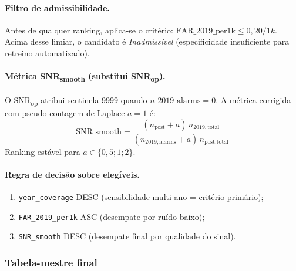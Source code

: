 \documentclass[11pt,a4paper]{article}
\begin{document}
\paragraph{Filtro de admissibilidade.}
Antes de qualquer ranking, aplica-se o crit\'erio:
$\mathrm{FAR\_2019\_per1k} \leq 0{,}20/1k$. Acima desse limiar, o
candidato \'e \emph{Inadmiss\'ivel} (espe\-ci\-fi\-ci\-da\-de
insuficiente para retreino automa\-ti\-zado).

\paragraph{M\'etrica SNR\textsubscript{smooth} (substitui SNR\textsubscript{op}).}
O SNR\textsubscript{op} atribui sentinela 9999 quando
$n\_2019\_\text{alarms}\!=\!0$. A m\'etrica corrigida com
pseudo-contagem de Laplace $a\!=\!1$ \'e:
\[
\mathrm{SNR\_smooth} =
   \frac{(n_\text{post}+a)\,n_{2019,\text{total}}}
        {(n_{2019,\text{alarms}}+a)\,n_\text{post,total}}
\]
Ranking est\'avel para $a\in\{0{,}5; 1; 2\}$.

\paragraph{Regra de decis\~ao sobre eleg\'iveis.}
\begin{enumerate}[leftmargin=1.4em,itemsep=2pt]
    \item \texttt{year\_coverage} DESC (sensibilidade multi-ano = crit\'erio
          prim\'ario);
    \item \texttt{FAR\_2019\_per1k} ASC (desempate por ru\'ido baixo);
    \item \texttt{SNR\_smooth} DESC (desempate final por qualidade do sinal).
\end{enumerate}

\subsubsection{Tabela-mestre final}
\end{document}
